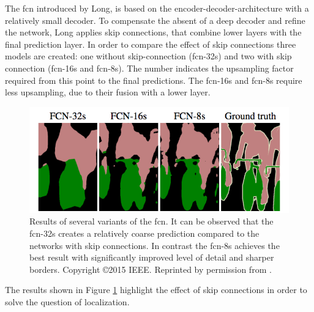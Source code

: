 The \gls{fcn} introduced by Long, is based on the encoder-decoder-architecture with a relatively small decoder.
To compensate the absent of a deep decoder and refine the network, Long applies skip connections, that combine lower layers with the final prediction layer.
In order to compare the effect of skip connections three models are created: one without skip-connection (\gls{fcn}-32s) and two with skip connection (\gls{fcn}-16s and \gls{fcn}-8s).
The number indicates the upsampling factor required from this point to the final predictions.
The \gls{fcn}-16s and \gls{fcn}-8s require less upsampling, due to their fusion with a lower layer.
\begin{figure}
	\includegraphics[width=\linewidth]{figures/chap223_fcn_results.png}	
	\caption[\gls{fcn} Predictions]{
		Results of several variants of the \gls{fcn}. 
		It can be observed that the \gls{fcn}-32s creates a relatively coarse prediction compared to the networks with skip connections.
		In contrast the \gls{fcn}-8s achieves the best result with significantly improved level of detail and sharper borders.
		Copyright \copyright 2015 IEEE. Reprinted by permission from \cite{LSD15-FCN}.}
	\label{fig:ch2:sec2:fcn_res}
\end{figure}
The results shown in Figure \ref{fig:ch2:sec2:fcn_res} highlight the effect of skip connections in order to solve the question of localization.

